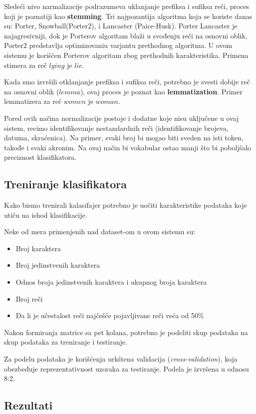 Sledeći nivo narmalizacije podrazumeva uklanjanje prefiksa i sufiksa reči,
proces koji je poznatiji kao \textbf{stemming}. Tri najpozantija algoritma koja se
koriste danas su: Porter, Snowball(Porter2), i Lancaster (Paice-Husk). Porter
Lancaster je najagresivniji, dok je Porterov algoritam blaži u svođenju reči na
osnovni oblik, Porter2 predstavlja optimizovaniu varjantu prethodnog algoritma.
U ovom sistemu je korišćen Porterov algoritam zbog prethodnih karakteristika.
Primena stimera za reč $lying$ je $lie$.

Kada smo izvršili otklanjanje prefiksa i sufiksa reči, potrebno je svesti dobije
reč na osnovni oblik ($lemma$), ovaj proces je poznat kao \textbf{lemmatization}.
Primer lemmatizera za reč $women$ je $woman$.

Pored ovih načina normalizacije postoje i dodatne koje nisu uključene u ovaj sistem,
recimo identifikovanje nestandardnih reči (identifikovanje brojeva, datuma, skraćenica). Na primer,
svaki broj bi mogao biti sveden na isti token, takođe i svaki akronim. Na ovaj
način bi vokabular ostao manji što bi poboljšalo preciznost klasifikatora.


\subsection{Treniranje klasifikatora}
Kako bismo trenirali kalasifajer potrebno je uočiti karakteristike podataka
koje utiču na ishod klasifikacije.

Neke od mera primenjenih nad dataset-om u ovom sistemu su:
\begin{itemize}
  \item Broj karaktera
  \item Broj jedinstvenih karaktera
  \item Odnos broja jedinstvenih karaktera i ukupnog broja karaktera
  \item Broj reči
  \item Da li je učestalost reči najčešće pojavljivane reči veća od 50\%
\end{itemize}

Nakon formiranja matrice sa pet kolana, potrebno je podeliti skup podataka na
skup podataka za treniranje i testiranje.

Za podelu podataka je korišćenja urkštena validacija (\textit{cross-validation}),
koja obezbeđuje reprezentativnost uzoraka za testiranje. Podela je izvršena
u odnosu 8:2.

\subsection{Rezultati}

